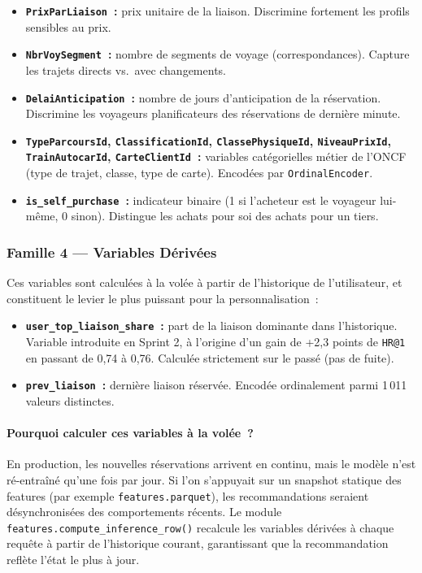 \documentclass[12pt, a4paper]{report}
\begin{document}
\begin{itemize}
\item \textbf{\texttt{PrixParLiaison}~:} prix unitaire de la liaison.
    Discrimine fortement les profils sensibles au prix.
\item \textbf{\texttt{NbrVoySegment}~:} nombre de segments de voyage
    (correspondances). Capture les trajets directs vs.\ avec changements.
\item \textbf{\texttt{DelaiAnticipation}~:} nombre de jours d'anticipation
    de la réservation. Discrimine les voyageurs planificateurs des
    réservations de dernière minute.
\item \textbf{\texttt{TypeParcoursId}, \texttt{ClassificationId},
    \texttt{ClassePhysiqueId}, \texttt{NiveauPrixId},
    \texttt{TrainAutocarId}, \texttt{CarteClientId}~:} variables
    catégorielles métier de l'ONCF (type de trajet, classe, type de carte).
    Encodées par \texttt{OrdinalEncoder}.
\item \textbf{\texttt{is\_self\_purchase}~:} indicateur binaire (1 si
    l'acheteur est le voyageur lui-même, 0 sinon). Distingue les achats
    pour soi des achats pour un tiers.
\end{itemize}

\subsubsection{Famille 4 --- Variables Dérivées}

Ces variables sont calculées à la volée à partir de l'historique de
l'utilisateur, et constituent le levier le plus puissant pour la
personnalisation~:

\begin{itemize}
\item \textbf{\texttt{user\_top\_liaison\_share}~:} part de la liaison
    dominante dans l'historique. Variable introduite en Sprint 2, à
    l'origine d'un gain de +2{,}3 points de \texttt{HR@1} en passant de
    0{,}74 à 0{,}76. Calculée strictement sur le passé (pas de fuite).
\item \textbf{\texttt{prev\_liaison}~:} dernière liaison réservée. Encodée
    ordinalement parmi 1\,011 valeurs distinctes.
\end{itemize}

\paragraph{Pourquoi calculer ces variables à la volée~?} En production,
les nouvelles réservations arrivent en continu, mais le modèle n'est
ré-entraîné qu'une fois par jour. Si l'on s'appuyait sur un snapshot
statique des features (par exemple \texttt{features.parquet}), les
recommandations seraient désynchronisées des comportements récents. Le
module \texttt{features.compute\_inference\_row()} recalcule les
variables dérivées à chaque requête à partir de l'historique courant,
garantissant que la recommandation reflète l'état le plus à jour.
\end{document}
